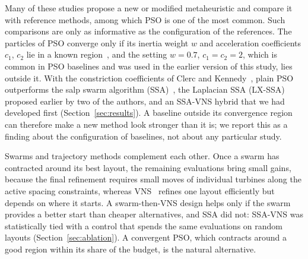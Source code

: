 \documentclass[journal,twoside]{IEEEtran}
\begin{document}
Many of these studies propose a new or modified metaheuristic and compare it with reference methods, among which PSO is one of the most common. Such comparisons are only as informative as the configuration of the references. The particles of PSO converge only if its inertia weight $w$ and acceleration coefficients $c_1$, $c_2$ lie in a known region~\cite{Clerc2002,Poli2009}, and the setting $w=0.7$, $c_1=c_2=2$, which is common in PSO baselines and was used in the earlier version of this study, lies outside it. With the constriction coefficients of Clerc and Kennedy~\cite{Clerc2002}, plain PSO outperforms the salp swarm algorithm (SSA)~\cite{Mirjalili2017}, the Laplacian SSA (LX-SSA)~\cite{Solanki2023} proposed earlier by two of the authors, and an SSA-VNS hybrid that we had developed first (Section~\ref{sec:results}).
A baseline outside its convergence region can therefore make a new method look stronger than it is; we report this as a finding about the configuration of baselines, not about any particular study.

Swarms and trajectory methods complement each other. Once a swarm has contracted around its best layout, the remaining evaluations bring small gains, because the final refinement requires small moves of individual turbines along the active spacing constraints, whereas VNS~\cite{Mladenovic1997,Hansen2001} refines one layout efficiently but depends on where it starts. A swarm-then-VNS design helps only if the swarm provides a better start than cheaper alternatives, and SSA did not: SSA-VNS was statistically tied with a control that spends the same evaluations on random layouts (Section~\ref{sec:ablation}).
A convergent PSO, which contracts around a good region within its share of the budget, is the natural alternative.
\end{document}
